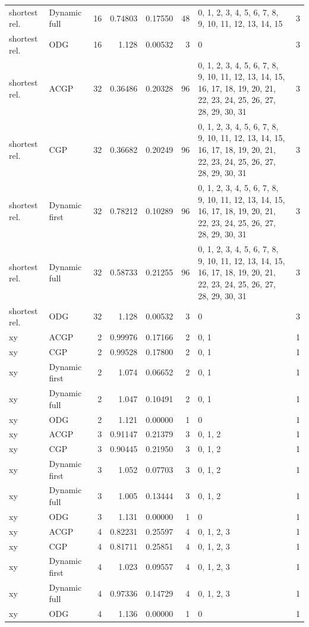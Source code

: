 \documentclass[10pt,a4paper]{article}
\begin{document}
\begin{longtable}{@{}p{23mm}p{29mm}rrrrp{36mm}r@{}}
shortest rel. & Dynamic full & 16 & 0.74803 & 0.17550 & 48 & 0, 1, 2, 3, 4, 5, 6, 7, 8, 9, 10, 11, 12, 13, 14, 15 & 3 \\
shortest rel. & ODG & 16 & 1.128 & 0.00532 & 3 & 0 & 3 \\
shortest rel. & ACGP & 32 & 0.36486 & 0.20328 & 96 & 0, 1, 2, 3, 4, 5, 6, 7, 8, 9, 10, 11, 12, 13, 14, 15, 16, 17, 18, 19, 20, 21, 22, 23, 24, 25, 26, 27, 28, 29, 30, 31 & 3 \\
shortest rel. & CGP & 32 & 0.36682 & 0.20249 & 96 & 0, 1, 2, 3, 4, 5, 6, 7, 8, 9, 10, 11, 12, 13, 14, 15, 16, 17, 18, 19, 20, 21, 22, 23, 24, 25, 26, 27, 28, 29, 30, 31 & 3 \\
shortest rel. & Dynamic first & 32 & 0.78212 & 0.10289 & 96 & 0, 1, 2, 3, 4, 5, 6, 7, 8, 9, 10, 11, 12, 13, 14, 15, 16, 17, 18, 19, 20, 21, 22, 23, 24, 25, 26, 27, 28, 29, 30, 31 & 3 \\
shortest rel. & Dynamic full & 32 & 0.58733 & 0.21255 & 96 & 0, 1, 2, 3, 4, 5, 6, 7, 8, 9, 10, 11, 12, 13, 14, 15, 16, 17, 18, 19, 20, 21, 22, 23, 24, 25, 26, 27, 28, 29, 30, 31 & 3 \\
shortest rel. & ODG & 32 & 1.128 & 0.00532 & 3 & 0 & 3 \\
xy & ACGP & 2 & 0.99976 & 0.17166 & 2 & 0, 1 & 1 \\
xy & CGP & 2 & 0.99528 & 0.17800 & 2 & 0, 1 & 1 \\
xy & Dynamic first & 2 & 1.074 & 0.06652 & 2 & 0, 1 & 1 \\
xy & Dynamic full & 2 & 1.047 & 0.10491 & 2 & 0, 1 & 1 \\
xy & ODG & 2 & 1.121 & 0.00000 & 1 & 0 & 1 \\
xy & ACGP & 3 & 0.91147 & 0.21379 & 3 & 0, 1, 2 & 1 \\
xy & CGP & 3 & 0.90445 & 0.21950 & 3 & 0, 1, 2 & 1 \\
xy & Dynamic first & 3 & 1.052 & 0.07703 & 3 & 0, 1, 2 & 1 \\
xy & Dynamic full & 3 & 1.005 & 0.13444 & 3 & 0, 1, 2 & 1 \\
xy & ODG & 3 & 1.131 & 0.00000 & 1 & 0 & 1 \\
xy & ACGP & 4 & 0.82231 & 0.25597 & 4 & 0, 1, 2, 3 & 1 \\
xy & CGP & 4 & 0.81711 & 0.25851 & 4 & 0, 1, 2, 3 & 1 \\
xy & Dynamic first & 4 & 1.023 & 0.09557 & 4 & 0, 1, 2, 3 & 1 \\
xy & Dynamic full & 4 & 0.97336 & 0.14729 & 4 & 0, 1, 2, 3 & 1 \\
xy & ODG & 4 & 1.136 & 0.00000 & 1 & 0 & 1 \\

\end{longtable}
\end{document}
